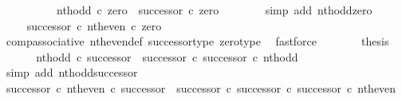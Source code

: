 \begin{isabellebody}
\ \ \isamarkupfalse%
\ {\isacharminus}{\kern0pt}\isanewline
\ \ \ \ \isamarkupfalse%
\ {\isachardoublequoteopen}nth{\isacharunderscore}{\kern0pt}odd\ {\isasymcirc}\isactrlsub c\ zero\ {\isacharequal}{\kern0pt}\ successor\ {\isasymcirc}\isactrlsub c\ zero{\isachardoublequoteclose}\isanewline
\ \ \ \ \ \ \isamarkupfalse%
\ {\isacharparenleft}{\kern0pt}simp\ add{\isacharcolon}{\kern0pt}\ nth{\isacharunderscore}{\kern0pt}odd{\isacharunderscore}{\kern0pt}zero{\isacharparenright}{\kern0pt}\isanewline
\ \ \ \ \isamarkupfalse%
\ \isamarkupfalse%
\ {\isachardoublequoteopen}{\isachardot}{\kern0pt}{\isachardot}{\kern0pt}{\isachardot}{\kern0pt}\ {\isacharequal}{\kern0pt}\ {\isacharparenleft}{\kern0pt}successor\ {\isasymcirc}\isactrlsub c\ nth{\isacharunderscore}{\kern0pt}even{\isacharparenright}{\kern0pt}\ {\isasymcirc}\isactrlsub c\ zero{\isachardoublequoteclose}\isanewline
\ \ \ \ \ \ \isamarkupfalse%
\ comp{\isacharunderscore}{\kern0pt}associative{}\ nth{\isacharunderscore}{\kern0pt}even{\isacharunderscore}{\kern0pt}def{}\ successor{\isacharunderscore}{\kern0pt}type\ zero{\isacharunderscore}{\kern0pt}type\ \isamarkupfalse%
\ fastforce\isanewline
\ \ \ \ \isamarkupfalse%
\ \isamarkupfalse%
\ {\isacharquery}{\kern0pt}thesis\isacommand{{\isachardot}{\kern0pt}}\isamarkupfalse%
\isanewline
\ \ \isamarkupfalse%
\isanewline
\isanewline
\ \ \isamarkupfalse%
\ {\isachardoublequoteopen}nth{\isacharunderscore}{\kern0pt}odd\ {\isasymcirc}\isactrlsub c\ successor\ {\isacharequal}{\kern0pt}\ {\isacharparenleft}{\kern0pt}successor\ {\isasymcirc}\isactrlsub c\ successor{\isacharparenright}{\kern0pt}\ {\isasymcirc}\isactrlsub c\ nth{\isacharunderscore}{\kern0pt}odd{\isachardoublequoteclose}\isanewline
\ \ \ \ \isamarkupfalse%
\ {\isacharparenleft}{\kern0pt}simp\ add{\isacharcolon}{\kern0pt}\ nth{\isacharunderscore}{\kern0pt}odd{\isacharunderscore}{\kern0pt}successor{\isacharparenright}{\kern0pt}\isanewline
\isanewline
\ \ \isamarkupfalse%
\ {\isachardoublequoteopen}{\isacharparenleft}{\kern0pt}successor\ {\isasymcirc}\isactrlsub c\ nth{\isacharunderscore}{\kern0pt}even{\isacharparenright}{\kern0pt}\ {\isasymcirc}\isactrlsub c\ successor\ {\isacharequal}{\kern0pt}\ {\isacharparenleft}{\kern0pt}successor\ {\isasymcirc}\isactrlsub c\ successor{\isacharparenright}{\kern0pt}\ {\isasymcirc}\isactrlsub c\ successor\ {\isasymcirc}\isactrlsub c\ nth{\isacharunderscore}{\kern0pt}even{\isachardoublequoteclose}\isanewline

\end{isabellebody}
